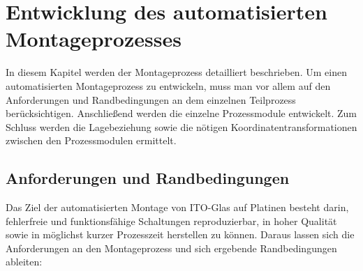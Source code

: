 \chapter{Entwicklung des automatisierten Montageprozesses}
In diesem Kapitel werden der Montageprozess detailliert beschrieben. Um einen automatisierten Montageprozess zu entwickeln, muss man vor allem auf den Anforderungen und Randbedingungen an dem einzelnen Teilprozess berücksichtigen. Anschließend werden die einzelne Prozessmodule entwickelt. Zum Schluss werden die Lagebeziehung sowie die nötigen Koordinatentransformationen zwischen den Prozessmodulen ermittelt.
\section{Anforderungen und Randbedingungen}
\label{sec:Anforderungen}
Das Ziel der automatisierten Montage von ITO-Glas auf Platinen besteht darin, fehlerfreie und funktionsfähige Schaltungen reproduzierbar, in hoher Qualität sowie in möglichst kurzer Prozesszeit herstellen zu können. Daraus lassen sich die Anforderungen an den Montageprozess und sich ergebende Randbedingungen ableiten:

